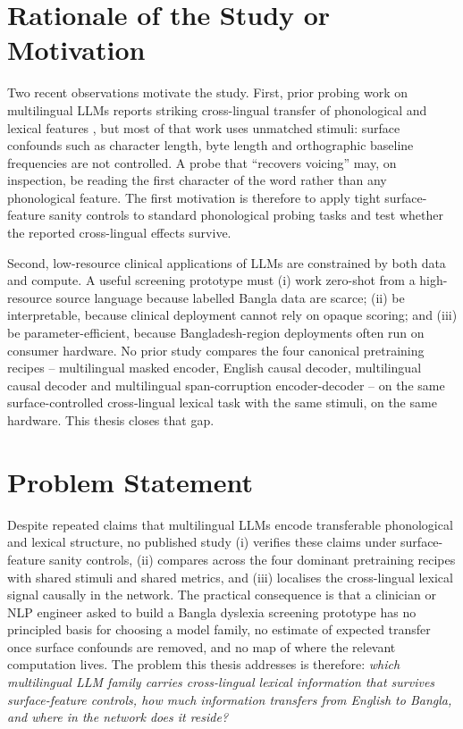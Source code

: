\section{Rationale of the Study or Motivation}

Two recent observations motivate the study. First, prior probing work on multilingual LLMs reports striking cross-lingual transfer of phonological and lexical features \cite{conneau2020xlmr,pires2019mbert,wu2020emerging}, but most of that work uses unmatched stimuli: surface confounds such as character length, byte length and orthographic baseline frequencies are not controlled. A probe that ``recovers voicing'' may, on inspection, be reading the first character of the word rather than any phonological feature. The first motivation is therefore to apply tight surface-feature sanity controls to standard phonological probing tasks and test whether the reported cross-lingual effects survive.

Second, low-resource clinical applications of LLMs are constrained by both data and compute. A useful screening prototype must (i) work zero-shot from a high-resource source language because labelled Bangla data are scarce; (ii) be interpretable, because clinical deployment cannot rely on opaque scoring; and (iii) be parameter-efficient, because Bangladesh-region deployments often run on consumer hardware. No prior study compares the four canonical pretraining recipes -- multilingual masked encoder, English causal decoder, multilingual causal decoder and multilingual span-corruption encoder-decoder -- on the same surface-controlled cross-lingual lexical task with the same stimuli, on the same hardware. This thesis closes that gap.

\section{Problem Statement}
\label{sec:rqs}

Despite repeated claims that multilingual LLMs encode transferable phonological and lexical structure, no published study (i) verifies these claims under surface-feature sanity controls, (ii) compares across the four dominant pretraining recipes with shared stimuli and shared metrics, and (iii) localises the cross-lingual lexical signal causally in the network. The practical consequence is that a clinician or NLP engineer asked to build a Bangla dyslexia screening prototype has no principled basis for choosing a model family, no estimate of expected transfer once surface confounds are removed, and no map of where the relevant computation lives. The problem this thesis addresses is therefore: \emph{which multilingual LLM family carries cross-lingual lexical information that survives surface-feature controls, how much information transfers from English to Bangla, and where in the network does it reside?}

